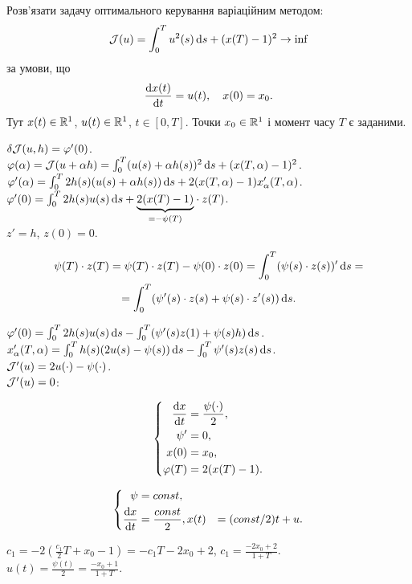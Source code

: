\begin{problem}
	Розв'язати задачу оптимального керування варіаційним методом: \[ \mathcal{J}(u) = \int_0^T u^2(s) \mathop{}\!\mathrm{d} s + (x(T) - 1)^2 \to \inf\] за умови, що \[ \frac{\mathop{}\!\mathrm{d} x(t)}{\mathop{}\!\mathrm{d} t} = u(t), \quad x(0) = x_0.\] Тут $x(t) \in \mathbb{R}^1$, $u(t)\in\mathbb{R}^1$, $t\in[0,T]$. Точки $x_0\in\mathbb{R}^1$ і момент часу $T$ є заданими.
\end{problem}

\begin{solution}
	$\delta \mathcal{J}(u, h) = \varphi'(0)$. \\

	$\varphi(\alpha) = \mathcal{J}(u + \alpha h) = \int_0^T (u(s) + \alpha h(s))^2 \mathop{}\!\mathrm{d} s + (x(T, \alpha) - 1)^2$. \\

	$\varphi'(\alpha) = \int_0^T 2 h(s) (u(s) + \alpha h(s)) \mathop{}\!\mathrm{d} s + 2 (x(T, \alpha) - 1) x_\alpha'(T, \alpha)$. \\

	$\varphi'(0) = \int_0^T 2 h(s) u(s) \mathop{}\!\mathrm{d} s + \underset{=-\psi(T)}{\underbrace{2 (x(T) - 1)}} \cdot z(T)$. \\

	$z' = h$, $z(0) = 0$.

	\begin{multline*} 
		\psi(T) \cdot z(T) = \psi(T) \cdot z(T) - \psi(0) \cdot z(0) = \int_0^T (\psi(s) \cdot z(s))' \mathop{}\!\mathrm{d} s = \\
		= \int_0^T (\psi'(s) \cdot z(s) + \psi(s) \cdot z'(s)) \mathop{}\!\mathrm{d} s.
	\end{multline*}

	$ \varphi'(0) = \int_0^T 2 h(s) u(s) \mathop{}\!\mathrm{d} s - \int_0^T (\psi'(s) z(1) + \psi(s) h) \mathop{}\!\mathrm{d} s$. \\

	$x_\alpha'(T, \alpha) = \int_0^T h(s) (2 u(s) - \psi(s)) \mathop{}\!\mathrm{d} s - \int_0^T \psi' (s) z(s) \mathop{}\!\mathrm{d} s$. \\

	$\mathcal{J}'(u) = 2 u (\cdot) - \psi(\cdot)$. \\

	$\mathcal{J}'(u) = 0$:

	\[ \left\{ \begin{aligned}
		\frac{\mathop{}\!\mathrm{d} x}{\mathop{}\!\mathrm{d} t} &= \frac{\psi(\cdot)}{2}, \\
		\psi' &= 0, \\
		x(0) &= x_0, \\
		\varphi(T) &= 2 (x(T) - 1).
	\end{aligned} \right. \]

	\[ \left\{ \begin{aligned}
		\psi &= const, \\
		\frac{\mathop{}\!\mathrm{d} x}{\mathop{}\!\mathrm{d} t} &= \frac{const}{2},
		x(t) &= (const / 2) t + u.
	\end{aligned} \right. \]

	$c_1 = - 2 \left( \frac{c_1}{2} T + x_0 - 1\right) = - c_1 T - 2 x_0 + 2$, $c_1 = \frac{-2x_0+2}{1+T}$. \\

	$u(t) = \frac{\psi(t)}{2} = \frac{-x_0+1}{1+T}$. 

\end{solution}

